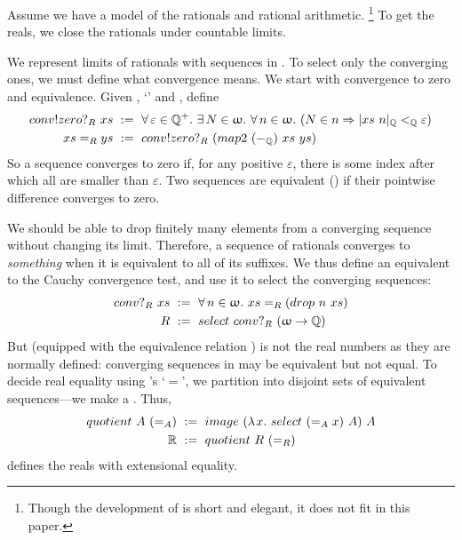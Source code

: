 Assume we have a model \tlzfc{\Rat,+_\Rat,-_\Rat,\times_\Rat,\div_\Rat} of the rationals and rational arithmetic.%
\footnote{Though the \targetlang development of \tlzfc{\Rat} is short and elegant, it does not fit in this paper.}
To get the reals, we close the rationals under countable limits.

We represent limits of rationals with sequences in \tlzfc{\lnat \to \Rat}. To select only the converging ones, we must define what convergence means. We start with convergence to zero and equivalence. Given \tlzfc{\Rat^+}, `\tlzfc{<_\Rat}' and \tlzfc{|\cdot|_\Rat}, define
\begin{equation}
\begin{aligned}
conv!zero?_R~xs&\ \objdef\ 
  \Forall{\varepsilon \in \Rat^+}
    \Exists{N \in \lnat}
      \Forall{n \in \lnat} (N \in n \imp |xs~n|_\Rat <_\Rat \varepsilon) \\
xs =_R ys&\ \objdef\ conv!zero?_R~(map2~(\minusq)~xs~ys)
\end{aligned}
\label{eqn:rational-conv-zero}
\end{equation}
So a sequence  converges to zero if, for any positive $\varepsilon$, there is some index  after which all  are smaller than $\varepsilon$. Two sequences are equivalent () if their pointwise difference converges to zero.

We should be able to drop finitely many elements from a converging sequence without changing its limit. Therefore, a sequence of rationals converges to \emph{something} when it is equivalent to all of its suffixes. We thus define an equivalent to the Cauchy convergence test, and use it to select the converging sequences:
\begin{equation}
\begin{aligned}
  conv?_R~xs&\ :=\  \forall\,{n \in \upomega}\ldotp\, xs =_R (drop~n~xs) \\
  R&\ :=\ select~conv?_R~(\upomega \to \mathbb{Q})
\end{aligned}
\end{equation}
But  (equipped with the equivalence relation ) is not the real numbers as they are normally defined: converging sequences in  may be equivalent but not equal. To decide real equality using \targetlang's `$=$', we partition  into disjoint sets of equivalent sequences---we make a . Thus,
\begin{equation}
\begin{aligned}
  quotient~A~(=_A)&\ :=\ image~(\lambda\mspace{2mu}{x}\ldotp\, select~(=_A x)~A)~A \\
  \mathbb{R}&\ :=\ quotient~R~(=_R)
\end{aligned}
\end{equation}
defines the reals with extensional equality.

